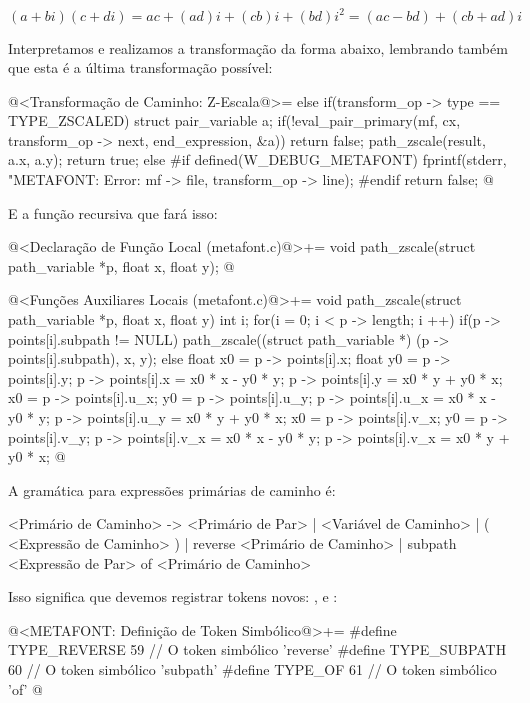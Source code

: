 {$$
(a+bi)(c+di) = ac + (ad)i + (cb)i + (bd)i^2 = (ac - bd) + (cb+ad)i
$$

Interpretamos e realizamos a transformação da forma abaixo, lembrando
também que esta é a última transformação possível:

\iniciocodigo
 @<Transformação de Caminho: Z-Escala@>=
else if(transform_op -> type == TYPE_ZSCALED){
  struct pair_variable a;
  if(!eval_pair_primary(mf, cx, transform_op -> next, end_expression, &a))
    return false;
  path_zscale(result, a.x, a.y);  
  return true;
}
else{
#if defined(W_DEBUG_METAFONT)
  fprintf(stderr, "METAFONT: Error: %
          mf -> file, transform_op -> line);
#endif
  return false;
}
@
\fimcodigo

E a função recursiva que fará isso:

\iniciocodigo
@<Declaração de Função Local (metafont.c)@>+=
void path_zscale(struct path_variable *p, float x, float y);
@
\fimcodigo

\iniciocodigo
@<Funções Auxiliares Locais (metafont.c)@>+=
void path_zscale(struct path_variable *p, float x, float y){
  int i;
  for(i = 0; i < p -> length; i ++){
    if(p -> points[i].subpath != NULL)
      path_zscale((struct path_variable *) (p -> points[i].subpath),
                  x, y);
    else{
      float x0 = p -> points[i].x;
      float y0 = p -> points[i].y;
      p -> points[i].x = x0 * x - y0 * y;
      p -> points[i].y = x0 * y + y0 * x;
      x0 = p -> points[i].u_x;
      y0 = p -> points[i].u_y;
      p -> points[i].u_x = x0 * x - y0 * y;
      p -> points[i].u_y = x0 * y + y0 * x;
      x0 = p -> points[i].v_x;
      y0 = p -> points[i].v_y;
      p -> points[i].v_x = x0 * x - y0 * y;
      p -> points[i].v_x = x0 * y + y0 * x;
    }
  }
}
@
\fimcodigo



A gramática para expressões primárias de caminho é:

\alinhaverbatim
<Primário de Caminho> -> <Primário de Par> | <Variável de Caminho> |
                       ( <Expressão de Caminho> ) |
                       reverse <Primário de Caminho> |
                       subpath <Expressão de Par> of <Primário de Caminho>
\alinhanormal

Isso significa que devemos registrar tokens
novos: ,  e :

\iniciocodigo
@<METAFONT: Definição de Token Simbólico@>+=
#define TYPE_REVERSE        59 // O token simbólico 'reverse'
#define TYPE_SUBPATH        60 // O token simbólico 'subpath'
#define TYPE_OF             61 // O token simbólico 'of'
@
\fimcodigo

}
